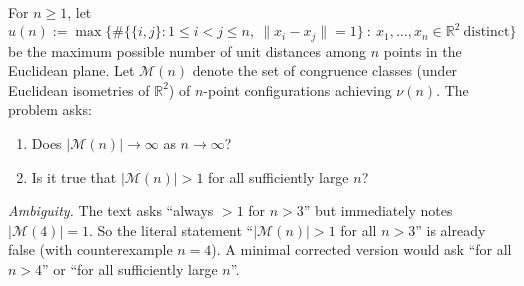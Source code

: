 For $n\ge 1$, let
\[
u(n) := \max\{\#\{\{i,j\}: 1\le i<j\le n,\ \|x_i-x_j\|=1\}\ :\ x_1,\dots,x_n\in\mathbb{R}^2\ \text{distinct}\}
\]
be the maximum possible number of unit distances among $n$ points in the Euclidean plane.
Let $\mathcal{M}(n)$ denote the set of congruence classes (under Euclidean isometries of $\mathbb{R}^2$) of $n$-point configurations achieving $\nu(n)$.
The problem asks:
\begin{enumerate}
\item Does $|\mathcal{M}(n)|\to\infty$ as $n\to\infty$?
\item Is it true that $|\mathcal{M}(n)|>1$ for all sufficiently large $n$?
\end{enumerate}

\medskip
\noindent\emph{Ambiguity.}
The text asks ``always $>1$ for $n>3$'' but immediately notes $|\mathcal{M}(4)|=1$.
So the literal statement ``$|\mathcal{M}(n)|>1$ for all $n>3$'' is already false (with counterexample $n=4$).
A minimal corrected version would ask ``for all $n>4$'' or ``for all sufficiently large $n$''.
